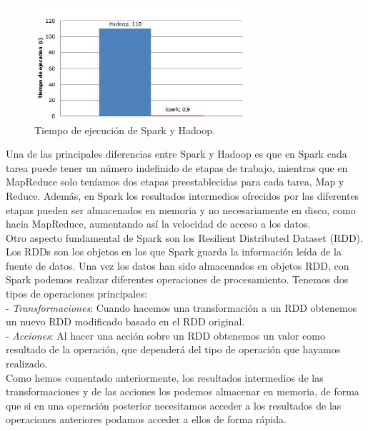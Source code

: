 \begin{figure}[H]
	\centering
	\includegraphics[width=0.7\textwidth]{./imagenes/comparacion_s_h}
	\caption{Tiempo de ejecución de Spark y Hadoop. \cite{Spark}} 
	
\end{figure}


Una de las principales diferencias entre Spark y Hadoop es que en Spark cada tarea puede tener un número indefinido de etapas de trabajo, mientras que en MapReduce solo teníamos dos etapas preestablecidas para cada tarea, Map y Reduce. Además, en Spark los resultados intermedios ofrecidos por las diferentes etapas pueden ser almacenados en memoria y no necesariamente en disco, como hacia MapReduce, aumentando así la velocidad de acceso a los datos.\\

Otro aspecto fundamental de Spark son los Resilient Distributed Dataset (RDD). Los RDDs son los objetos en los que Spark guarda la información leída de la fuente de datos. Una vez los datos han sido almacenados en objetos RDD, con Spark podemos realizar diferentes operaciones de procesamiento. Tenemos dos tipos de operaciones principales:\\

- \emph{Transformaciones}: Cuando hacemos una transformación a un RDD obtenemos un nuevo RDD modificado basado en el RDD original.\\

- \emph{Acciones}: Al hacer una acción sobre un RDD obtenemos un valor como resultado de la operación, que dependerá del tipo de operación que hayamos realizado.\\

Como hemos comentado anteriormente, los resultados intermedios de las transformaciones y de las acciones los podemos almacenar en memoria, de forma que si en una operación posterior necesitamos acceder a los resultados de las operaciones anteriores podamos acceder a ellos de forma rápida.\\

